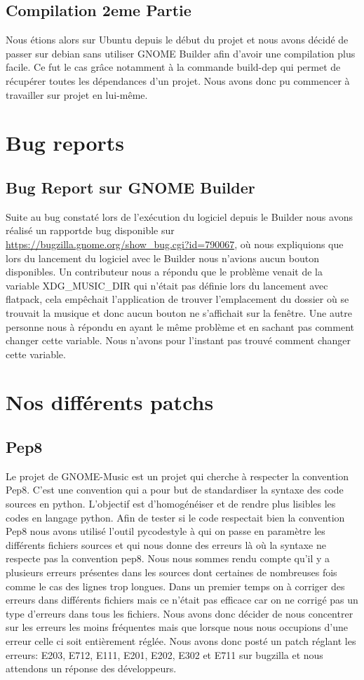 \documentclass[12pt]{report}
\begin{document}
\subsection{Compilation 2eme Partie}
Nous étions alors sur Ubuntu depuis le début du projet et nous avons
décidé de passer sur debian sans utiliser GNOME Builder afin d'avoir 
une compilation plus facile. Ce fut le cas grâce notamment à la 
commande build-dep qui permet de récupérer toutes les dépendances d'un 
projet. Nous avons donc pu commencer à travailler sur projet en 
lui-même.

\section{Bug reports}
\subsection{Bug Report sur GNOME Builder}
Suite au bug constaté lors de l’exécution du logiciel depuis le Builder
nous avons réalisé un rapportde bug disponible sur 
\url{https://bugzilla.gnome.org/show_bug.cgi?id=790067}, où nous 
expliquions que lors du lancement du logiciel avec le Builder nous 
n'avions aucun bouton disponibles. Un contributeur nous a répondu que
le problème venait de la variable XDG\_MUSIC\_DIR qui n’était pas définie 
lors du lancement avec flatpack, cela empêchait l'application de trouver
l'emplacement du dossier où se trouvait la musique et donc aucun bouton
ne s'affichait sur la fenêtre. Une autre personne nous à répondu en 
ayant le même problème et en sachant pas comment changer cette variable.
Nous n'avons pour l'instant pas trouvé comment changer cette variable.

\section{Nos différents patchs}
\subsection{Pep8}
Le projet de GNOME-Music est un projet qui cherche à respecter la 
convention Pep8. C'est une convention qui a pour but de standardiser 
la syntaxe des code sources en  python. L'objectif est d’homogénéiser 
et de rendre plus lisibles les codes en langage python. Afin de tester 
si le code respectait bien la convention Pep8 nous avons utilisé l'outil
pycodestyle à qui on passe en paramètre les différents fichiers sources
et qui nous donne des erreurs là où la syntaxe ne respecte pas la 
convention pep8. Nous nous sommes rendu compte qu'il y a plusieurs erreurs
présentes dans les sources dont certaines de nombreuses fois comme le
cas des lignes trop longues. Dans un premier temps on à corriger des
erreurs dans différents fichiers mais ce n’était pas efficace car on 
ne corrigé pas un type d'erreurs dans tous les fichiers. Nous avons donc 
décider de nous concentrer sur les erreurs les moins fréquentes mais 
que lorsque nous nous occupions d'une erreur celle ci soit entièrement 
réglée. Nous avons donc posté un patch réglant les erreurs: E203, E712,
E111, E201, E202, E302 et E711 sur bugzilla et nous attendons un réponse 
des développeurs.
\end{document}
